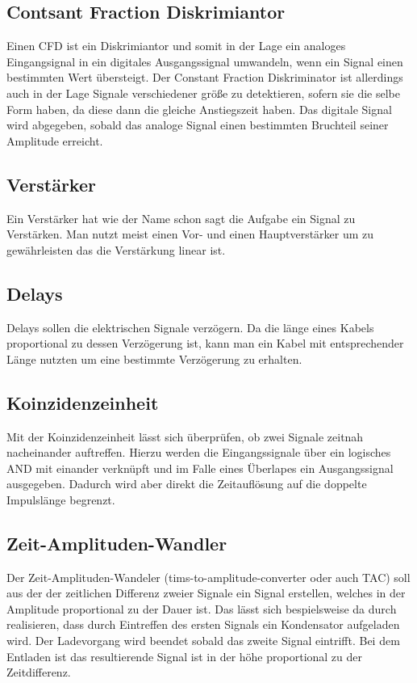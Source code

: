 \documentclass[11pt, ngerman, fleqn, DIV=15, headinclude, BCOR=2cm]{scrreprt}
\begin{document}
\subsection{Contsant Fraction Diskrimiantor}
Einen CFD ist ein Diskrimiantor und somit in der Lage ein analoges
Eingangsignal in ein digitales Ausgangssignal umwandeln, wenn ein Signal einen
bestimmten Wert übersteigt.
Der Constant Fraction Diskriminator ist allerdings auch in der Lage Signale
verschiedener größe zu detektieren, sofern sie die selbe Form haben, da diese
dann die gleiche Anstiegszeit haben. Das digitale Signal wird abgegeben, sobald
das analoge Signal einen bestimmten Bruchteil seiner Amplitude erreicht.

\subsection{Verstärker}
Ein Verstärker hat wie der Name schon sagt die Aufgabe ein Signal zu
Verstärken. Man nutzt meist einen Vor- und einen Hauptverstärker um zu
gewährleisten das die Verstärkung linear ist. 

\subsection{Delays}
Delays sollen die elektrischen Signale verzögern. Da die länge eines Kabels
proportional zu dessen Verzögerung ist, kann man ein Kabel mit entsprechender
Länge nutzten um eine bestimmte Verzögerung zu erhalten.

\subsection{Koinzidenzeinheit}
Mit der Koinzidenzeinheit lässt sich überprüfen, ob zwei Signale zeitnah
nacheinander auftreffen. Hierzu werden die Eingangssignale über ein logisches
AND mit einander verknüpft und im Falle eines Überlapes ein Ausgangssignal
ausgegeben. Dadurch wird aber direkt die Zeitauflösung auf die doppelte
Impulslänge begrenzt.

\subsection{Zeit-Amplituden-Wandler}
Der Zeit-Amplituden-Wandeler (tims-to-amplitude-converter oder auch TAC) soll
aus der der zeitlichen Differenz zweier Signale ein Signal erstellen, welches
in der Amplitude proportional zu der Dauer ist. Das lässt sich bespielsweise da
durch realisieren, dass durch Eintreffen des ersten Signals ein Kondensator
aufgeladen wird. Der Ladevorgang wird beendet sobald das zweite Signal
eintrifft. Bei dem Entladen ist das resultierende Signal ist in der höhe
proportional zu der Zeitdifferenz. 
\end{document}
